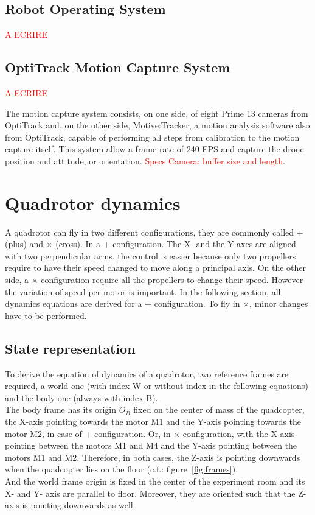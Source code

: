 \documentclass[a4paper, 12pt]{report}
\begin{document}
\subsection{Robot Operating System}
\textcolor{red}{A ECRIRE}
\subsection{OptiTrack Motion Capture System}
\textcolor{red}{A ECRIRE}

The motion capture system consists, on one side, of eight Prime 13 cameras from OptiTrack and, on the other side, Motive:Tracker, a motion analysis software also from OptiTrack, capable of performing all steps from calibration to the motion capture itself.
This system allow a frame rate of 240 FPS and capture the drone position and attitude, or orientation. \textcolor{red}{Specs Camera: buffer size and length}.

\newpage

\section{Quadrotor dynamics}
A quadrotor can fly in two different configurations, they are commonly called $+$ (plus) and $\times$ (cross). In a $+$ configuration. The X- and the Y-axes are aligned with two perpendicular arms, the control is easier because only two propellers require to have their speed changed to move along a principal axis. On the other side, a $\times$ configuration require all the propellers to change their speed. However the variation of speed per motor is important. In the following section, all dynamics equations are derived for a $+$ configuration. To fly in $\times$, minor changes have to be performed.

\subsection{State representation}
To derive the equation of dynamics of a quadrotor, two reference frames are required, a world one (with index W or without index in the following equations) and the body one (always with index B).\\
 The body frame has its origin $O_B$ fixed on the center of mass of the quadcopter, the X-axis pointing towards the motor M1 and the Y-axis pointing towards the motor M2, in case of $+$ configuration. Or, in $\times$ configuration, with the X-axis pointing between the motors M1 and M4 and the Y-axis pointing between the motors M1 and M2. Therefore, in both cases, the Z-axis is pointing downwards when the quadcopter lies on the floor (c.f.: figure~\ref{fig:frames}). \\
And the world frame origin is fixed in the center of the experiment room and its X- and Y- axis are parallel to floor. Moreover, they are oriented such that the Z-axis is pointing downwards as well. 
\end{document}

